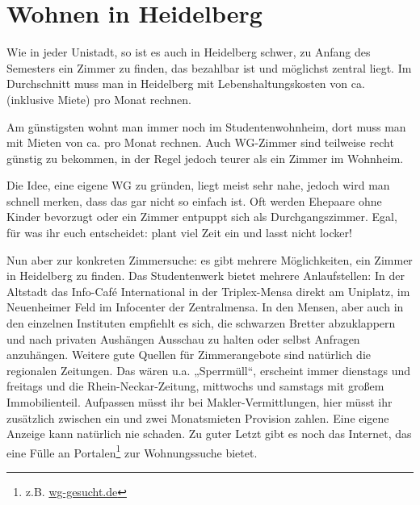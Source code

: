 \section{Wohnen in Heidelberg}



Wie in jeder Unistadt, so ist es auch in Heidelberg schwer, zu Anfang des Semesters
ein Zimmer zu finden, das bezahlbar ist und möglichst zentral liegt. Im Durchschnitt
muss man in Heidelberg mit Lebenshaltungskosten von ca.  (inklusive Miete)
pro Monat rechnen.

Am günstigsten wohnt man immer noch im Studentenwohnheim, dort muss man mit Mieten
von ca.  pro Monat rechnen. Auch WG-Zimmer sind teilweise recht
günstig zu bekommen, in der Regel jedoch teurer als ein Zimmer im Wohnheim.

Die Idee, eine eigene WG zu gründen, liegt meist sehr nahe, jedoch wird man schnell
merken, dass das gar nicht so einfach ist. Oft werden Ehepaare ohne Kinder bevorzugt
oder ein Zimmer entpuppt sich als Durchgangszimmer. Egal, für was ihr euch
entscheidet: plant viel Zeit ein und lasst nicht locker!

Nun aber zur konkreten Zimmersuche: es gibt mehrere Möglichkeiten, ein Zimmer in
Heidelberg zu finden. Das Studentenwerk bietet mehrere Anlaufstellen: In der
Altstadt das Info-Café International in der Triplex-Mensa direkt am Uniplatz, im
Neuenheimer Feld im Infocenter der Zentralmensa. In den Mensen, aber auch in den
einzelnen Instituten empfiehlt es sich, die schwarzen Bretter abzuklappern und nach
privaten Aushängen Ausschau zu halten oder selbst Anfragen anzuhängen. Weitere gute
Quellen für Zimmerangebote sind natürlich die regionalen Zeitungen. Das wären u.a.
„Sperrmüll“, erscheint immer dienstags und freitags und die Rhein-Neckar-Zeitung,
mittwochs und samstags mit großem Immobilienteil. Aufpassen müsst ihr bei
Makler-Vermittlungen, hier müsst ihr zusätzlich zwischen ein und zwei Monatsmieten
Provision zahlen. Eine eigene Anzeige kann natürlich nie schaden. Zu guter Letzt
gibt es noch das Internet, das eine Fülle an Portalen\footnote{z.B. \url{wg-gesucht.de}} zur Wohnungssuche bietet.\\

